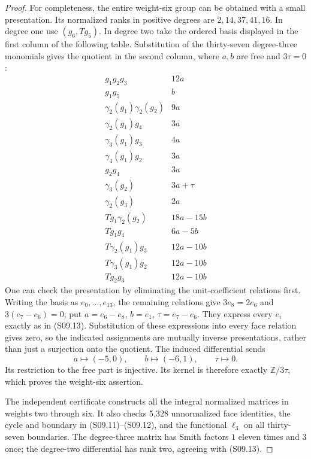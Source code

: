 \begin{proof}
For completeness, the entire weight-six group can be obtained
with a small presentation.  Its normalized ranks in positive
degrees are $2,14,37,41,16$.  In degree one use $(g_6,Tg_5)$.
In degree two take the ordered basis displayed in the first
column of the following table.  Substitution of the thirty-seven
degree-three monomials gives the quotient in the second column,
where $a,b$ are free and $3\tau=0$:
\[
\begin{array}{c|r}
g_1g_2g_3&12a\\
g_1g_5&b\\
\gamma_2(g_1)\gamma_2(g_2)&9a\\
\gamma_2(g_1)g_4&3a\\
\gamma_3(g_1)g_3&4a\\
\gamma_4(g_1)g_2&3a\\
g_2g_4&3a\\
\gamma_3(g_2)&3a+\tau\\
\gamma_2(g_3)&2a\\
Tg_1\gamma_2(g_2)&18a-15b\\
Tg_1g_4&6a-5b\\
T\gamma_2(g_1)g_3&12a-10b\\
T\gamma_3(g_1)g_2&12a-10b\\
Tg_2g_3&12a-10b
\end{array}
\tag{S09.13}
\]
One can check the presentation by eliminating the unit-coefficient
relations first.  Writing the basis as $e_0,\ldots,e_{13}$,
the remaining relations give $3e_8=2e_6$ and
$3(e_7-e_6)=0$; put $a=e_6-e_8$, $b=e_1$,
$\tau=e_7-e_6$.  They express every $e_i$ exactly as in
(S09.13).  Substitution of these expressions into every face
relation gives zero, so the indicated assignments are mutually
inverse presentations, rather than just a surjection onto the
quotient.  The induced differential sends
\[
       a\longmapsto(-5,0),\qquad
       b\longmapsto(-6,1),\qquad \tau\longmapsto0.
\]
Its restriction to the free part is injective.  Its kernel is
therefore exactly $\mathbb Z/3\tau$, which proves the
weight-six assertion.

The independent certificate constructs all the integral normalized
matrices in weights two through six.  It also checks 5,328
unnormalized face identities, the cycle and boundary in
(S09.11)--(S09.12), and the functional $\ell_3$ on all
thirty-seven boundaries.  The degree-three matrix has Smith
factors $1$ eleven times and $3$ once; the degree-two
differential has rank two, agreeing with (S09.13).
\end{proof}

